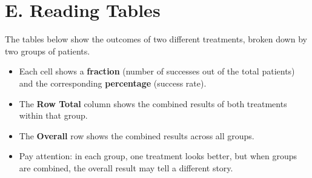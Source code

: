 \documentclass[9pt]{article}
\begin{document}
\section*{E. Reading Tables}

The tables below show the outcomes of two different treatments, broken down by two groups of patients.  

\begin{itemize}
  \item Each cell shows a \textbf{fraction} (number of successes out of the total patients) and the corresponding \textbf{percentage} (success rate).
  \item The \textbf{Row Total} column shows the combined results of both treatments within that group.
  \item The \textbf{Overall} row shows the combined results across all groups.
  \item Pay attention: in each group, one treatment looks better, but when groups are combined, the overall result may tell a different story.
\end{itemize}
\end{document}
